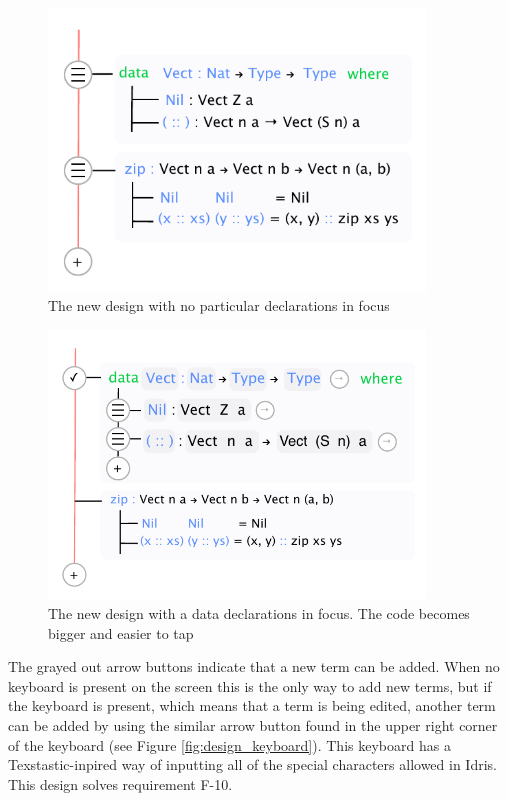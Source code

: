 \begin{figure}
	\centering
		\includegraphics[width=100mm]{diagrams/final_design_nothing_in_focus.pdf}
	\caption{The new design with no particular declarations in focus}
\label{fig:new_design_nothing_in_focus}
\end{figure}

\begin{figure}
	\centering
		\includegraphics[width=100mm]{diagrams/final_design_top_dec_in_focus.pdf}
	\caption{The new design with a data declarations in focus. The code becomes
	bigger and easier to tap}
\label{fig:new_design_data_in_focus}
\end{figure}

The grayed out arrow buttons indicate that a new term can be added. When no
keyboard is present on the screen this is the only way to add new terms, but if
the keyboard is present, which means that a term is being edited, another term
can be added by using the similar arrow button found in the upper right corner
of the keyboard (see Figure \ref{fig:design_keyboard}). This keyboard has a
Texstastic-inpired way of inputting all of the special characters allowed in
Idris. This design solves requirement F-10.

